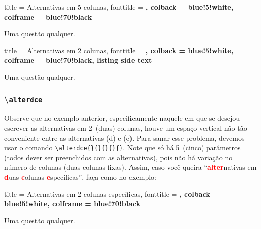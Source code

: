 \begin{tcblisting}
{
  title     = Alternativas em 5 colunas,
  fonttitle = \bfseries,
  colback   = blue!5!white,
  colframe  = blue!70!black
}
\begin{atividade}
\questao Uma questão qualquer.
\end{atividade}
\end{tcblisting}

\begin{tcblisting}
{
  title     = Alternativas em 2 colunas,
  fonttitle = \bfseries,
  colback   = blue!5!white,
  colframe  = blue!70!black,
  listing side text
}
\begin{atividade}
\questao Uma questão qualquer.
\end{atividade}
\end{tcblisting}
%
\subsubsection*{\textbackslash \texttt{alterdce}} %
%
Observe que no exemplo anterior, especificamente naquele em que se desejou 
escrever as alternativas em 2~(duas) colunas, houve um espaço vertical não tão 
conveniente entre as alternativas (d) e (e).
Para sanar esse problema, devemos usar o comando \verb|\alterdce{}{}{}{}{}|.
Note que só há 5~(cinco) parâmetros (todos dever ser preenchidos com as 
alternativas), pois não há variação no número de colunas (duas colunas fixas).
Assim, caso você queira ``\textcolor{red}{\textbf{alter}}nativas em
\textcolor{red}{\textbf{d}}uas \textcolor{red}{\textbf{c}}olunas 
\textcolor{red}{\textbf{e}}specíficas'', faça como no exemplo:

\begin{tcblisting}
{
  title     = Alternativas em 2 colunas específicas,
  fonttitle = \bfseries,
  colback   = blue!5!white,
  colframe  = blue!70!black
}
\begin{atividade}
\questao Uma questão qualquer.
\end{atividade}
\end{tcblisting}



